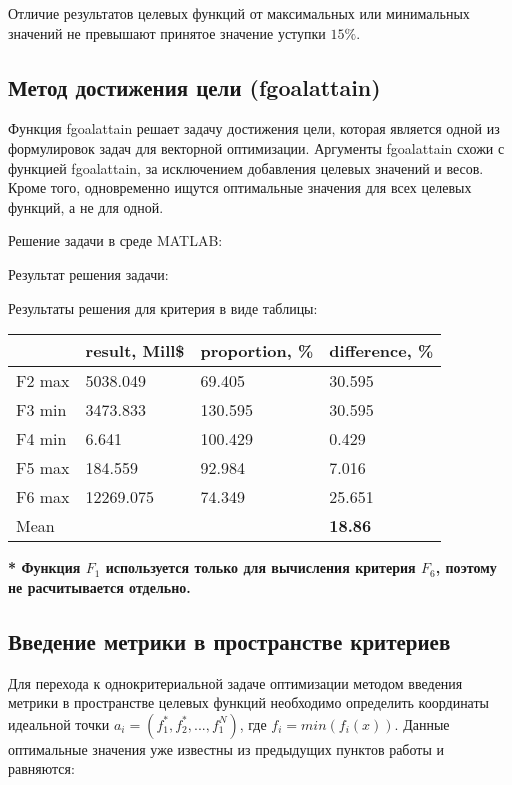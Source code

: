 \documentclass[14pt,a4paper,report]{report}
\begin{document}
Отличие результатов целевых функций от максимальных или минимальных значений не превышают принятое значение уступки $15\%$.

\subsection{Метод достижения цели (fgoalattain)}

Функция fgoalattain решает задачу достижения цели, которая является одной из формулировок задач для векторной оптимизации. Аргументы fgoalattain схожи с функцией fgoalattain, за исключением добавления целевых значений и весов. Кроме того, одновременно ищутся оптимальные значения для всех целевых  функций, а не для одной.

Решение задачи в среде MATLAB:



Результат решения задачи:



Результаты решения для критерия в виде таблицы:

\begin{table}[h!]
	\centering
	\bgroup
	\def\arraystretch{1}
	\begin{tabular}{ | m{1.2cm} | m{1.9cm} | m{2.2cm} | m{2.2cm} | }
		\hline
		& result, Mill\$ & proportion, \% & difference, \% \\ \hline
		F2 max & 5038.049 & 69.405 & 30.595 \\ \hline
		F3 min & 3473.833 & 130.595 & 30.595 \\ \hline
		F4 min & 6.641 & 100.429 & 0.429 \\ \hline
		F5 max & 184.559 & 92.984 & 7.016 \\ \hline
		F6 max & 12269.075 & 74.349 & 25.651 \\ \hline
		Mean & & & \textbf{18.86} \\
		\hline
	\end{tabular}
	\egroup
\end{table}

\textbf{* Функция $F_1$ используется только для вычисления критерия $F_6$, поэтому не расчитывается отдельно.}

\subsection{Введение метрики в пространстве критериев}

Для перехода к однокритериальной задаче оптимизации методом введения метрики в пространстве целевых функций необходимо определить координаты идеальной точки $a_i=(f_1^*,f_2^*,...,f_1^N)$, где $f_i=min(f_i(x))$. Данные оптимальные значения уже известны из предыдущих пунктов работы и равняются:
\end{document}

